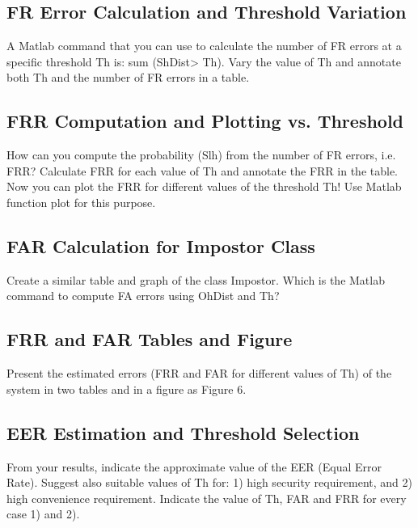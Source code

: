 \documentclass[a4paper,12pt]{article}
\begin{document}
\subsection{FR Error Calculation and Threshold Variation}
A Matlab command that you can use to calculate the number of FR errors at a specific threshold Th is: sum (ShDist> Th). Vary the value of Th and annotate both Th and the number of FR errors in a table.


\subsection{FRR Computation and Plotting vs. Threshold}
How can you compute the probability (Slh) from the number of FR errors, i.e. FRR? Calculate FRR for each value of Th and annotate the FRR in the table. Now you can plot the FRR for different values of the threshold Th! Use Matlab function plot for this purpose.

\subsection{FAR Calculation for Impostor Class}
Create a similar table and graph of the class Impostor. Which is the Matlab command to compute FA errors using OhDist and Th?


\subsection{FRR and FAR Tables and Figure}
Present the estimated errors (FRR and FAR for different values of Th) of the system in two tables and in a figure as Figure 6.

\subsection{EER Estimation and Threshold Selection}
From your results, indicate the approximate value of the EER (Equal Error Rate). Suggest also suitable values of Th for: 1) high security requirement, and 2) high convenience requirement. Indicate the value of Th, FAR and FRR for every case 1) and 2).



\tableofcontents
\newpage

\listoffigures
\newpage

\listoftables
\newpage


\newpage
\printbibliography
\end{document}
